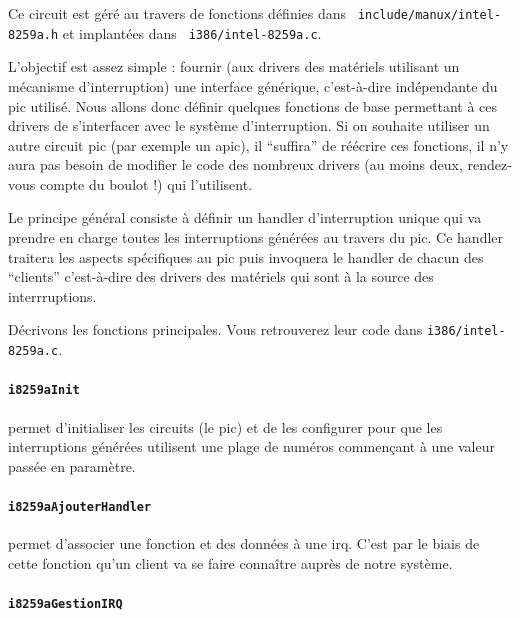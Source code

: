   Ce circuit est géré au travers de fonctions définies dans {\tt
include/manux/intel-8259a.h} et implantées dans {\tt
     i386/intel-8259a.c}.

   L'objectif est assez simple : fournir (aux drivers des matériels
utilisant un mécanisme d'interruption) une interface générique,
c'est-à-dire indépendante du {\sc pic} utilisé. Nous allons donc
définir quelques fonctions de base permettant à ces drivers de
s'interfacer avec le système d'interruption. Si on souhaite utiliser
un autre circuit {\sc pic} (par exemple un  {\sc apic}), il
``suffira'' de réécrire ces fonctions, il n'y aura pas besoin de
modifier le code des nombreux drivers (au moins deux, rendez-vous
compte du boulot !) qui l'utilisent.

   Le principe général consiste à définir un handler d'interruption
unique qui va prendre en charge toutes les interruptions générées au
travers du {\sc pic}. Ce handler traitera les aspects spécifiques au
{\sc pic} puis invoquera le handler de chacun des ``clients''
c'est-à-dire des drivers des matériels qui sont à la source des
interrruptions.

   Décrivons les fonctions principales. Vous retrouverez leur code
dans {\tt i386/intel-8259a.c}.

\paragraph{\tt i8259aInit} permet d'initialiser
les circuits (le {\sc pic}) et de les configurer pour que les
interruptions générées utilisent une plage de numéros commençant à une
valeur passée en paramètre.
\paragraph{\tt i8259aAjouterHandler} permet d'associer une fonction
et des données à une {\sc irq}. C'est par le biais de cette fonction
qu'un client va se faire connaître auprès de notre système.
\paragraph{\tt i8259aGestionIRQ}
